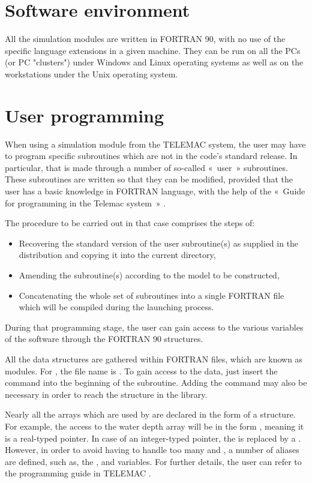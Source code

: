 \section{Software environment}

All the simulation modules are written in FORTRAN 90, with no use of the
specific language extensions in a given machine. They can be run on all the PCs
(or PC "clusters") under Windows and Linux operating systems as well as on the
workstations under the Unix operating system.

\section{User programming}

When using a simulation module from the TELEMAC system, the user may have to
program specific subroutines which are not in the code's standard release. In
particular, that is made through a number of so-called «~user~» subroutines.
These subroutines are written so that they can be modified, provided that the
user has a basic knowledge in FORTRAN language, with the help of the «~Guide
for programming in the Telemac system~» \cite{HervouetProg2009}.

The procedure to be carried out in that case comprises the steps of:

\begin{itemize}
\item Recovering the standard version of the user subroutine(s) as supplied in
the distribution and copying it into the current directory,
\item Amending the subroutine(s) according to the model to be constructed,
\item Concatenating the whole set of subroutines into a single FORTRAN file
which will be compiled during the  launching process.
\end{itemize}

During that programming stage, the user can gain access to the various
variables of the software through the FORTRAN 90 structures.

All the data structures are gathered within FORTRAN files, which are known as
modules. For , the file name is . To gain
access to the  data, just insert the command  into the beginning of the subroutine. Adding the
command  may also be necessary in order to reach the structure in the
\bief library.

Nearly all the arrays which are used by  are declared in the form of
a structure. For example, the access to the water depth array will be in the
form ,  meaning it is a real-typed pointer.
In case of an integer-typed pointer, the  is replaced by a .
However, in order to avoid having to handle too many  and ,
a number of aliases are defined, such as, the ,  and
 variables. For further details, the user can refer to
the programming guide in TELEMAC \cite{HervouetProg2009}.
